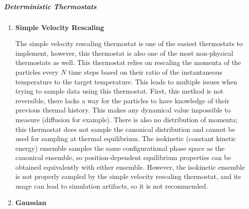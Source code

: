 \documentclass[9pt,bestpractices]{livecoms}
\begin{document}
\subparagraph{Deterministic Thermostats}
\begin{enumerate}[listparindent=\parindent]
    \item \textbf{Simple Velocity Rescaling}

        The simple velocity rescaling thermostat is one of the easiest thermostats to implement, however, this thermostat is also one of the most non-physical thermostats as well.
        This thermostat relies on rescaling the momenta of the particles every $N$ time steps based on their ratio of the instantaneous temperature to the target temperature\cite{thermostatAlgorithms2005}.
        This leads to multiple issues when trying to sample data using this thermostat.
        First, this method is not reversible, there lacks a way for the particles to have knowledge of their previous thermal history.
        This makes any dynamical value impossible to measure (diffusion for example).
        There is also no distribution of momenta; this thermostat does not sample the canonical distribution and cannot be used for sampling at thermal equilibrium.
        The isokinetic (constant kinetic energy) ensemble samples the same configurational phase space as the canonical ensemble, so position-dependent equilibrium properties can be obtained equivalently with either ensemble\cite{Minary:2003:JChemPhys:Algorithms}.
        However, the isokinetic ensemble is not properly sampled by the simple velocity rescaling thermostat, and its usage can lead to simulation artifacts, so it is not recommended\cite{Braun:2018:arXiv:Anomalous}.

    \item \textbf{Gaussian}
        

\end{enumerate}
\end{document}
